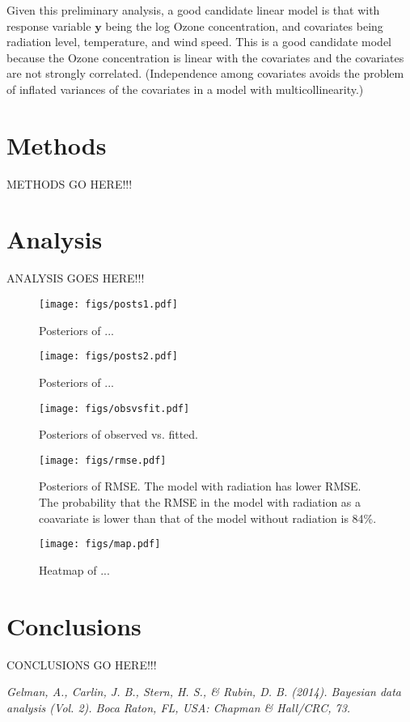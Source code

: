 \documentclass{../../tex_template/asaproc}
\newcommand{\y}{\bm y}
\begin{document}
Given this preliminary analysis, a good candidate linear model is that with
response variable $\y$ being the log Ozone concentration, and covariates being
radiation level, temperature, and wind speed. This is a good candidate model
because the Ozone concentration is linear with the covariates and the 
covariates are not strongly correlated. (Independence among covariates avoids
the problem of inflated variances of the covariates in a model with
multicollinearity.)

\section{Methods}
METHODS GO HERE!!!

\section{Analysis}
ANALYSIS GOES HERE!!!
\begin{figure}[H]
  \texttt{[image: figs/posts1.pdf]}
  \caption{\small Posteriors of ... }
  \label{fig:posts1}
\end{figure}

\begin{figure}[H]
  \texttt{[image: figs/posts2.pdf]}
  \caption{\small Posteriors of ... }
  \label{fig:posts2}
\end{figure}

\begin{figure}[H]
  \texttt{[image: figs/obsvsfit.pdf]}
  \caption{\small Posteriors of observed vs. fitted. }
  \label{fig:obsvsfit}
\end{figure}

\begin{figure}[H]
  \texttt{[image: figs/rmse.pdf]}
  \caption{\small Posteriors of RMSE. The model with radiation has lower RMSE. The probability that the RMSE in the
   model with radiation as a coavariate is lower than that of the model without radiation is 84\%.}
  \label{fig:rmse}
\end{figure}

\begin{figure}[H]
  \texttt{[image: figs/map.pdf]}
  \caption{\small Heatmap of ...}
  \label{fig:map}
\end{figure}

\section{Conclusions}
CONCLUSIONS GO HERE!!!

\begin{references}
{\footnotesize
\itemsep=3pt
\item {\em Gelman, A., Carlin, J. B., Stern, H. S., \& Rubin, D. B. (2014). Bayesian data analysis (Vol. 2). Boca Raton, FL, USA: Chapman \& Hall/CRC, 73.}
}

\end{references}
\end{document}
